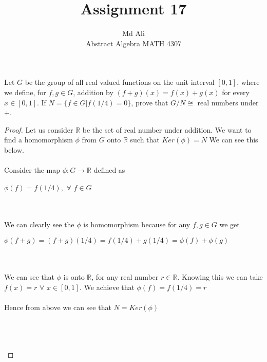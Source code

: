 \documentclass[12pt]{article}
\newenvironment{problem}[2][Problem]{\begin{trivlist}
\item[\hskip \labelsep {\bfseries #1}\hskip \labelsep {\bfseries #2.}]}{\end{trivlist}}
\begin{document}
 
 
\title{Assignment 17}%
\author{Md Ali\\ %
Abstract Algebra MATH 4307} %
 
\maketitle
 
\begin{problem}{2.7.2} %
Let $G$ be the group of all real valued functions on the unit interval $[0,1]$, where we define, for $f,g \in G$, addition by $(f+g)(x)=f(x)+g(x)$ for every $x \in [0,1]$. If $N = \{ f \in G | f(1/4) = 0 \}$, prove that $G/N \cong$ real numbers under $+$.
\end{problem}
 
\begin{proof}
Let us consider $\mathbb{R}$ be the set of real number under addition. We want to find a homomorphism $\phi$ from $G$ onto $\mathbb{R}$ such that $Ker(\phi) = N$ We can see this below. \\ \\
Consider the map $\phi : G \rightarrow \mathbb{R}$ defined as \\ 
\centerline{$\phi(f) = f(1/4),$ $\forall$ $f \in G$} \\ \\
We can clearly see the $\phi$ is homomorphism because for any $f,g \in G$ we get \\ 
\centerline{$\phi(f+g) = (f+g)(1/4) = f(1/4)+g(1/4) = \phi(f) + \phi(g)$} \\ \\
We can see that $\phi$ is onto $\mathbb{R}$, for any real number $r \in \mathbb{R}$. Knowing this we can take $f(x) = r$ $\forall$ $x \in [0,1]$. We achieve that $\phi(f) = f(1/4) = r$ \\ \\
Hence from above we can see that $N=Ker(\phi)$ \\ \\
\centerline{} \\ \\


\end{proof}
\end{document}
